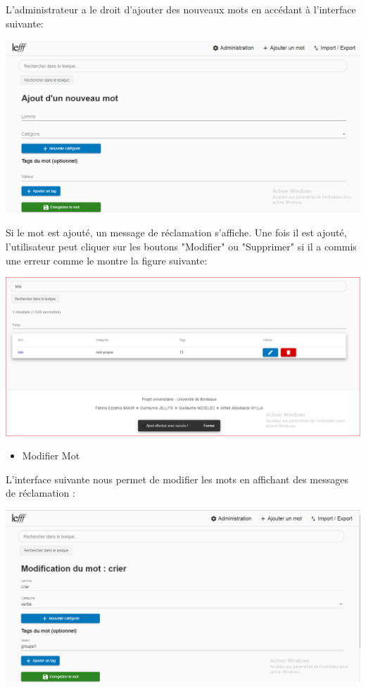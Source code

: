\documentclass[12pt,a4paper]{article}
\begin{document}
L'administrateur a le droit d'ajouter des nouveaux mots  en accédant à l'interface suivante: 


\includegraphics[width=150mm]{img/Ajoutermot.PNG}


Si le mot  est ajouté, un message de réclamation s'affiche. Une fois il est ajouté, l'utilisateur peut cliquer sur les boutons "Modifier" ou "Supprimer" si il a commis une erreur comme le montre la figure suivante:


\includegraphics[width=150mm]{img/AjoutEffectuer.PNG}


\begin{itemize}  
  \item Modifier Mot
\end{itemize}
L'interface suivante nous permet de modifier les mots en affichant des messages de réclamation : 

\includegraphics[width=150mm]{img/ModificationMot.PNG}
\end{document}
